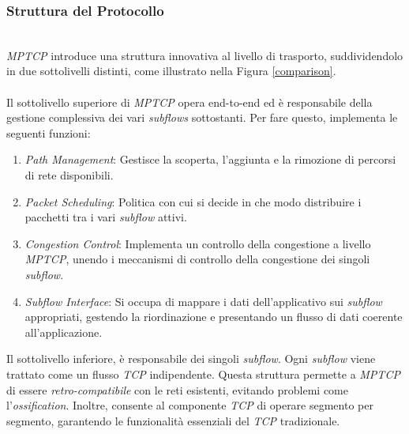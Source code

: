 \subsubsection{Struttura del Protocollo}
~\\
\indent \emph{MPTCP} introduce una struttura innovativa al livello di trasporto, suddividendolo in due sottolivelli distinti, come illustrato nella Figura \ref{comparison}.
\\\\
Il sottolivello superiore di \emph{MPTCP} opera end-to-end ed è responsabile della gestione complessiva dei vari \emph{subflows} sottostanti. Per fare questo, implementa le seguenti funzioni:
\begin{enumerate}[label=\roman*]
    \item \emph{Path Management}: Gestisce la scoperta, l'aggiunta e la rimozione di percorsi di rete disponibili.
    \item \emph{Packet Scheduling}: Politica con cui si decide in che modo distribuire i pacchetti tra i vari \emph{subflow} attivi.
    \item \emph{Congestion Control}: Implementa un controllo della congestione a livello \emph{MPTCP}, unendo i meccanismi di controllo della congestione dei singoli \emph{subflow}. 
    \item \emph{Subflow Interface}: Si occupa di mappare i dati dell'applicativo sui \emph{subflow} appropriati, gestendo la riordinazione e presentando un flusso di dati coerente all'applicazione.
\end{enumerate}
\noindent Il sottolivello inferiore, è responsabile dei singoli \emph{subflow}. Ogni \emph{subflow} viene trattato come un flusso \emph{TCP} indipendente. Questa struttura permette a \emph{MPTCP} di essere \emph{retro-compatibile} con le reti esistenti, evitando problemi come l'\emph{ossification}. Inoltre, consente al componente \emph{TCP} di operare segmento per segmento, garantendo le funzionalità essenziali del \emph{TCP} tradizionale.
